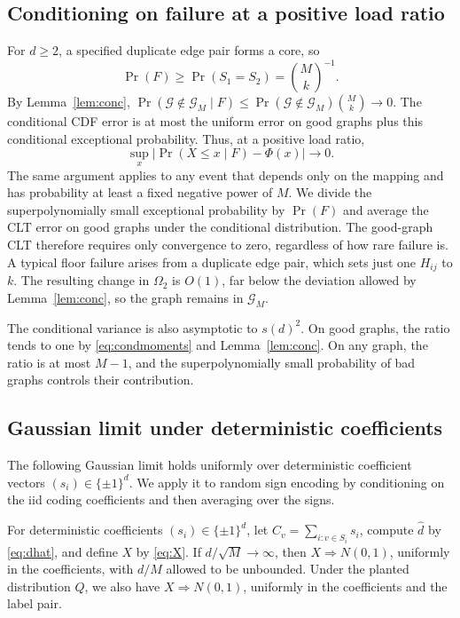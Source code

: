 \subsection{Conditioning on failure at a positive load ratio}
For $d\ge2$, a specified duplicate edge pair forms a core, so
\begin{equation*}
\Pr(F)\ge\Pr(S_1=S_2)=\binom Mk^{-1}.
\end{equation*}
By Lemma~\ref{lem:conc}, $\Pr(\mathcal G\notin\mathcal G_M\mid F)\le\Pr(\mathcal G\notin\mathcal G_M)\binom Mk\to0$. The conditional CDF error is at most the uniform error on good graphs plus this conditional exceptional probability. Thus, at a positive load ratio,
\begin{equation*}
\sup_x\bigl|\Pr(X\le x\mid F)-\Phi(x)\bigr|\to0.
\end{equation*}
The same argument applies to any event that depends only on the mapping and has probability at least a fixed negative power of $M$. We divide the superpolynomially small exceptional probability by $\Pr(F)$ and average the CLT error on good graphs under the conditional distribution. The good-graph CLT therefore requires only convergence to zero, regardless of how rare failure is. A typical floor failure arises from a duplicate edge pair, which sets just one $H_{ij}$ to $k$. The resulting change in $\Omega_2$ is $O(1)$, far below the deviation allowed by Lemma~\ref{lem:conc}, so the graph remains in $\mathcal G_M$.

The conditional variance is also asymptotic to $s(d)^2$. On good graphs, the ratio tends to one by \eqref{eq:condmoments} and Lemma~\ref{lem:conc}. On any graph, the ratio is at most $M-1$, and the superpolynomially small probability of bad graphs controls their contribution.

\subsection{Gaussian limit under deterministic coefficients}
The following Gaussian limit holds uniformly over deterministic coefficient vectors $(s_i)\in\{\pm1\}^d$. We apply it to random sign encoding by conditioning on the iid coding coefficients and then averaging over the signs.

\begin{lemma}\label{lem:plantclt}
For deterministic coefficients $(s_i)\in\{\pm1\}^d$, let $C_v=\sum_{i:v\in S_i}s_i$, compute $\widehat d$ by \eqref{eq:dhat}, and define $X$ by \eqref{eq:X}. If $d/\sqrt M\to\infty$, then $X\Rightarrow N(0,1)$, uniformly in the coefficients, with $d/M$ allowed to be unbounded. Under the planted distribution $Q$, we also have $X\Rightarrow N(0,1)$, uniformly in the coefficients and the label pair.
\end{lemma}


